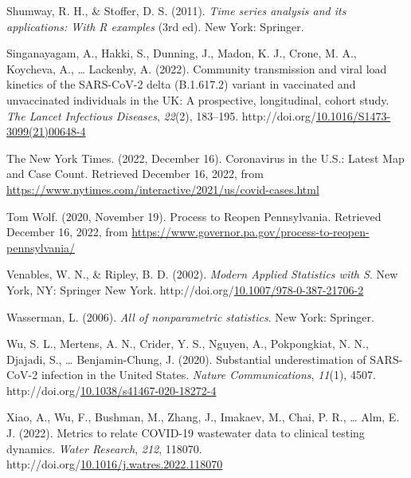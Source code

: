 \documentclass[12pt,twoside]{smiththesis}
\newlength{\cslhangindent}
\newenvironment{CSLReferences}[2] %
 {%
\setlength{\parindent}{0pt}
\ifodd #1 \everypar{\setlength{\hangindent}{\cslhangindent}}\ignorespaces\fi
\ifnum #2 > 0
\setlength{\parskip}{#2\baselineskip}
  \fi
}%
{}
\begin{document}
\begin{CSLReferences}{1}{0}
\leavevmode{}%
Shumway, R. H., \& Stoffer, D. S. (2011). \emph{Time series analysis and its applications: With {R} examples} (3rd ed). {New York}: {Springer}.

\leavevmode{}%
Singanayagam, A., Hakki, S., Dunning, J., Madon, K. J., Crone, M. A., Koycheva, A., \ldots{} Lackenby, A. (2022). Community transmission and viral load kinetics of the {SARS-CoV-2} delta ({B}.1.617.2) variant in vaccinated and unvaccinated individuals in the {UK}: A prospective, longitudinal, cohort study. \emph{The Lancet Infectious Diseases}, \emph{22}(2), 183--195. http://doi.org/\href{https://doi.org/10.1016/S1473-3099(21)00648-4}{10.1016/S1473-3099(21)00648-4}

\leavevmode{}%
The New York Times. (2022, December 16). Coronavirus in the {U}.{S}.: {Latest Map} and {Case Count}. Retrieved December 16, 2022, from \url{https://www.nytimes.com/interactive/2021/us/covid-cases.html}

\leavevmode{}%
Tom Wolf. (2020, November 19). Process to {Reopen Pennsylvania}. Retrieved December 16, 2022, from \url{https://www.governor.pa.gov/process-to-reopen-pennsylvania/}

\leavevmode{}%
Venables, W. N., \& Ripley, B. D. (2002). \emph{Modern {Applied Statistics} with {S}}. {New York, NY}: {Springer New York}. http://doi.org/\href{https://doi.org/10.1007/978-0-387-21706-2}{10.1007/978-0-387-21706-2}

\leavevmode{}%
Wasserman, L. (2006). \emph{All of nonparametric statistics}. {New York}: {Springer}.

\leavevmode{}%
Wu, S. L., Mertens, A. N., Crider, Y. S., Nguyen, A., Pokpongkiat, N. N., Djajadi, S., \ldots{} Benjamin-Chung, J. (2020). Substantial underestimation of {SARS-CoV-2} infection in the {United States}. \emph{Nature Communications}, \emph{11}(1), 4507. http://doi.org/\href{https://doi.org/10.1038/s41467-020-18272-4}{10.1038/s41467-020-18272-4}

\leavevmode{}%
Xiao, A., Wu, F., Bushman, M., Zhang, J., Imakaev, M., Chai, P. R., \ldots{} Alm, E. J. (2022). Metrics to relate {COVID-19} wastewater data to clinical testing dynamics. \emph{Water Research}, \emph{212}, 118070. http://doi.org/\href{https://doi.org/10.1016/j.watres.2022.118070}{10.1016/j.watres.2022.118070}


\end{CSLReferences}
\end{document}
